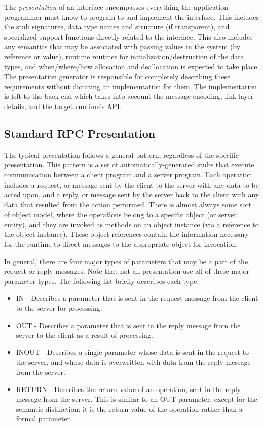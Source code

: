 The \emph{presentation} of an interface encompasses everything the application
programmer must know to program to and implement the interface.  This includes
the stub signatures, data type names and structure (if transparent), and
specialized support functions directly related to the interface.  This also
includes any semantics that may be associated with passing values in the system
(by reference or value), runtime routines for initialization/destruction of the
data types, and when/where/how allocation and deallocation is expected to take
place.  The presentation generator is responsible for completely describing
these requirements without dictating an implementation for them.  The
implementation is left to the back end which takes into account the message
encoding, link-layer details, and the target runtime's API\@.

\subsection{Standard RPC Presentation}
\label{subsec:PG:Standard RPC Presentation}

The typical \RPC{} presentation follows a general pattern, regardless of the
specific presentation.  This pattern is a set of automatically-generated stubs
that execute communication between a client program and a server program.  Each
operation includes a request, or message sent by the client to the server with
any data to be acted upon, and a reply, or message sent by the server back to
the client with any data that resulted from the action performed.  There is
almost always some sort of object model, where the operations belong to a
specific object (or server entity), and they are invoked as methods on an
object instance (via a reference to the object instance).  These object
references contain the information necessary for the runtime to direct messages
to the appropriate object for invocation.

In general, there are four major types of parameters that may be a part of the
request or reply messages.  Note that not all presentation use all of these
major parameter types.  The following list briefly describes each type.

\begin{itemize}
  \item IN - Describes a parameter that is sent in the request message from the
  client to the server for processing.

  \item OUT - Describes a parameter that is sent in the reply message from the
  server to the client as a result of processing.

  \item INOUT - Describes a single parameter whose data is sent in the request
  to the server, and whose data is overwritten with data from the reply message
  from the server.

  \item RETURN - Describes the return value of an operation, sent in the reply
  message from the server.  This is similar to an OUT parameter, except for the
  semantic distinction: it is the return value of the operation rather than a
  formal parameter.
\end{itemize}

